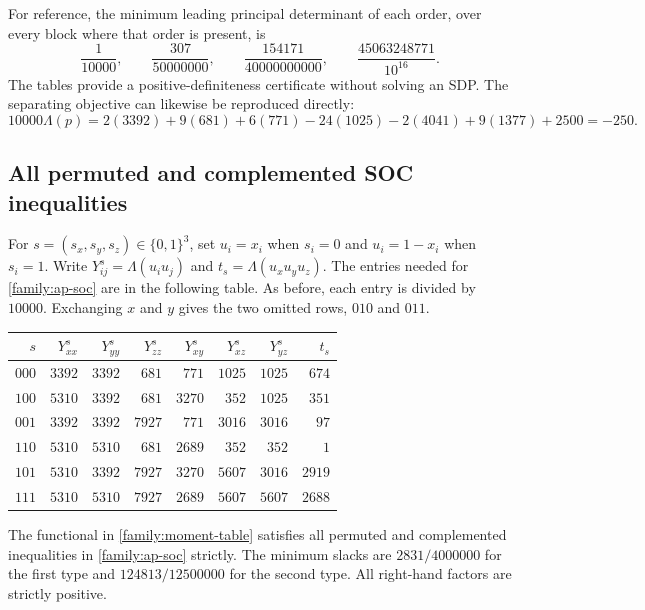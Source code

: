For reference, the minimum leading principal determinant of each order,
over every block where that order is present, is
\begin{equation}
\label{family:determinant-minima}
\frac1{10000},\qquad
\frac{307}{50000000},\qquad
\frac{154171}{40000000000},\qquad
\frac{45063248771}{10^{16}}.
\end{equation}
The tables provide a positive-definiteness certificate without solving
an SDP. The separating objective can likewise be reproduced directly:
\[
10000\Lambda(p)
=2(3392)+9(681)+6(771)-24(1025)-2(4041)+9(1377)+2500
=-250.
\]

\subsection{All permuted and complemented SOC inequalities}

For $s=(s_x,s_y,s_z)\in\{0,1\}^3$, set
$u_i=x_i$ when $s_i=0$ and $u_i=1-x_i$ when $s_i=1$.
Write $Y^s_{ij}=\Lambda(u_iu_j)$ and $t_s=\Lambda(u_xu_yu_z)$.
The entries needed for \eqref{family:ap-soc} are in the following table.
As before, each entry is divided by $10000$. Exchanging $x$ and $y$
gives the two omitted rows, $010$ and $011$.
\begin{center}
\begin{tabular}{rrrrrrrr}
\toprule
$s$ & $Y^s_{xx}$ & $Y^s_{yy}$ & $Y^s_{zz}$ & $Y^s_{xy}$ & $Y^s_{xz}$ & $Y^s_{yz}$ & $t_s$\\
\midrule
$000$ & $3392$ & $3392$ & $681$ & $771$ & $1025$ & $1025$ & $674$\\
$100$ & $5310$ & $3392$ & $681$ & $3270$ & $352$ & $1025$ & $351$\\
$001$ & $3392$ & $3392$ & $7927$ & $771$ & $3016$ & $3016$ & $97$\\
$110$ & $5310$ & $5310$ & $681$ & $2689$ & $352$ & $352$ & $1$\\
$101$ & $5310$ & $3392$ & $7927$ & $3270$ & $5607$ & $3016$ & $2919$\\
$111$ & $5310$ & $5310$ & $7927$ & $2689$ & $5607$ & $5607$ & $2688$\\
\bottomrule
\end{tabular}
\end{center}

\begin{proposition}
\label{family:ap-certificate}
The functional in \cref{family:moment-table} satisfies all permuted and
complemented inequalities in \eqref{family:ap-soc} strictly. The minimum
slacks are $2831/4000000$ for the first type and
$124813/12500000$ for the second type. All right-hand factors are strictly
positive.
\end{proposition}


